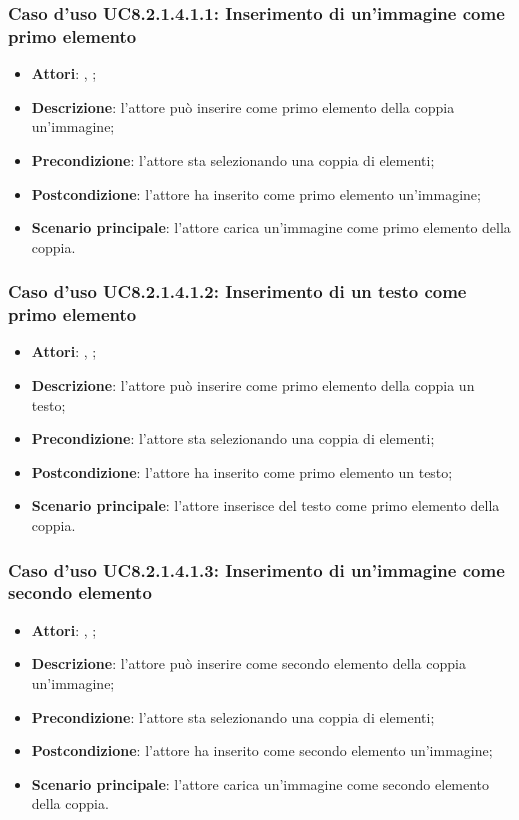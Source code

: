 		\subsubsection{Caso d'uso UC8.2.1.4.1.1: Inserimento di un'immagine come primo elemento}
		\label{UC8.2.1.4.1.1}
		\begin{itemize}
			\item \textbf{Attori}: \uau, \uaupro;
			\item \textbf{Descrizione}: l'attore può inserire come primo elemento della coppia un'immagine;
			\item \textbf{Precondizione}: l'attore sta selezionando una coppia di elementi;
			\item \textbf{Postcondizione}: l'attore ha inserito come primo elemento un'immagine;
			\item \textbf{Scenario principale}: l'attore carica un'immagine come primo elemento della coppia.
		\end{itemize}
		
		\subsubsection{Caso d'uso UC8.2.1.4.1.2: Inserimento di un testo come primo elemento}
		\label{UC8.2.1.4.1.2}
		\begin{itemize}
			\item \textbf{Attori}: \uau, \uaupro;
			\item \textbf{Descrizione}: l'attore può inserire come primo elemento della coppia un testo;
			\item \textbf{Precondizione}: l'attore sta selezionando una coppia di elementi;
			\item \textbf{Postcondizione}: l'attore ha inserito come primo elemento un testo;
			\item \textbf{Scenario principale}: l'attore inserisce del testo come primo elemento della coppia.
		\end{itemize}
		
			\subsubsection{Caso d'uso UC8.2.1.4.1.3: Inserimento di un'immagine come secondo elemento}
		\label{UC8.2.1.4.1.3}
		\begin{itemize}
			\item \textbf{Attori}: \uau, \uaupro;
			\item \textbf{Descrizione}: l'attore può inserire come secondo elemento della coppia un'immagine;
			\item \textbf{Precondizione}: l'attore sta selezionando una coppia di elementi;
			\item \textbf{Postcondizione}: l'attore ha inserito come secondo elemento un'immagine;
			\item \textbf{Scenario principale}: l'attore carica un'immagine come secondo elemento della coppia.
		\end{itemize}
		
